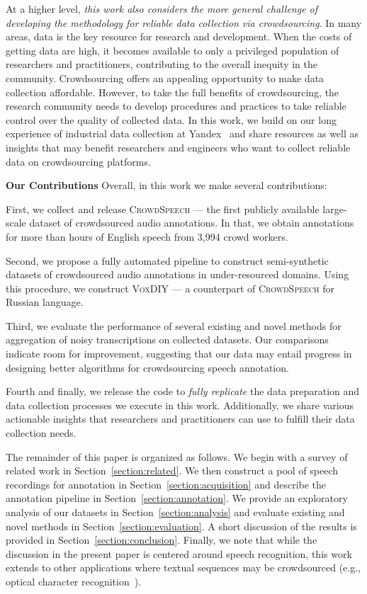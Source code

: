 \documentclass{article}
\newcommand{\speech}{\textsc{CrowdSpeech}}
\newcommand{\vox}{\textsc{VoxDIY}}
\begin{document}
At a higher level, \emph{this work also considers the more general challenge of developing the methodology for reliable data collection via crowdsourcing}. In many areas, data is the key resource for research and development. When the costs of getting data are high, it becomes available to only a privileged population of researchers and practitioners, contributing to the overall inequity in the community. Crowdsourcing offers an appealing opportunity to make data collection affordable. However, to take the full benefits of crowdsourcing, the research community needs to develop procedures and practices to take reliable control over the quality of collected data. In this work, we build on our long experience of industrial data collection at Yandex~\citep{drutsa20crowd, drutsa20crowd2, drutsa21crowd} and share resources as well as insights that may benefit researchers and engineers who want to collect reliable data on crowdsourcing platforms.

\textbf{Our Contributions} Overall, in this work we make several contributions:

First, we collect and release \speech{} --- the first publicly available large-scale dataset of crowdsourced audio annotations. In that, we obtain annotations for more than   hours of English speech from 3,994 crowd workers. 

Second, we propose a fully automated pipeline to construct semi-synthetic datasets of crowdsourced audio annotations in under-resourced domains. Using this procedure, we construct \vox{} --- a counterpart of \speech{} for Russian language.

Third, we evaluate the performance of several existing and novel methods for aggregation of noisy transcriptions on collected datasets. Our comparisons indicate room for improvement, suggesting that our data may entail progress in designing better algorithms for crowdsourcing speech annotation.

Fourth and finally, we release the code to \emph{fully replicate} the data preparation and data collection processes we execute in this work. Additionally, we share various actionable insights that researchers and practitioners can use to fulfill their data collection needs. 

The remainder of this paper is organized as follows. We begin with a survey of related work in Section~\ref{section:related}. We then construct a pool of speech recordings for annotation in Section~\ref{section:acquisition} and describe the annotation pipeline in Section~\ref{section:annotation}. We provide an exploratory analysis of our datasets in Section~\ref{section:analysis} and evaluate existing and novel methods in Section~\ref{section:evaluation}. A short discussion of the results is provided in Section~\ref{section:conclusion}. Finally, we note that while the discussion in the present paper is centered around speech recognition, this work extends to other applications where textual sequences may be crowdsourced (e.g., optical character recognition~\citep{chrons11making, clematide16ocr, vonahn08re}).
\end{document}
